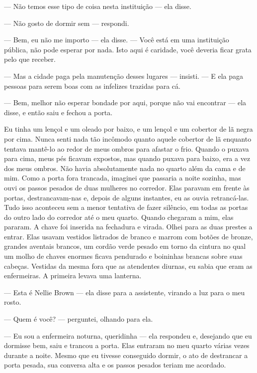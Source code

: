 --- Não temos esse tipo de coisa nesta instituição --- ela disse.

--- Não gosto de dormir sem --- respondi.

--- Bem, eu não me importo --- ela disse. --- Você está em uma
instituição pública, não pode esperar por nada. Isto aqui é caridade,
você deveria ficar grata pelo que receber.

--- Mas a cidade paga pela manutenção desses lugares --- insisti. --- E
ela paga pessoas para serem boas com as infelizes trazidas para cá.

--- Bem, melhor não esperar bondade por aqui, porque não vai encontrar
--- ela disse, e então saiu e fechou a porta.


Eu tinha um lençol e um oleado por baixo, e um lençol e um cobertor de lã
negra por cima. Nunca senti nada tão incômodo quanto aquele cobertor de
lã enquanto tentava mantê-lo ao redor de meus ombros para afastar o
frio. Quando o puxava para cima, meus pés ficavam expostos, mas quando
puxava para baixo, era a vez dos meus ombros. Não havia absolutamente
nada no quarto além da cama e de mim. Como a porta fora trancada,
imaginei que passaria a noite sozinha, mas ouvi os passos pesados de
duas mulheres no corredor. Elas paravam em frente às portas, 
destrancavam-nas e, depois de alguns instantes, eu as ouvia retrancá-las.
Tudo isso aconteceu sem a menor tentativa de fazer silêncio, em todas as
portas do outro lado do corredor até o meu quarto. Quando chegaram a
mim, elas pararam. A chave foi inserida na fechadura e virada. Olhei
para as duas prestes a entrar. Elas usavam vestidos listrados de branco
e marrom com botões de bronze, grandes aventais brancos, um cordão verde
pesado em torno da cintura no qual um molho de chaves enormes ficava
pendurado e boininhas brancas sobre suas cabeças. Vestidas da mesma fora
que as atendentes diurnas, eu sabia que eram as enfermeiras. A primeira
levava uma lanterna.

--- Esta é Nellie Brown --- ela disse para a assistente, virando a luz
para o meu rosto.

--- Quem é você? --- perguntei, olhando para ela.

--- Eu sou a enfermeira noturna, queridinha --- ela respondeu e,
desejando que eu dormisse bem, saiu e trancou a porta. Elas entraram
no meu quarto várias vezes durante a noite. Mesmo que eu tivesse
conseguido dormir, o ato de destrancar a porta pesada, sua conversa alta
e os passos pesados teriam me acordado.

